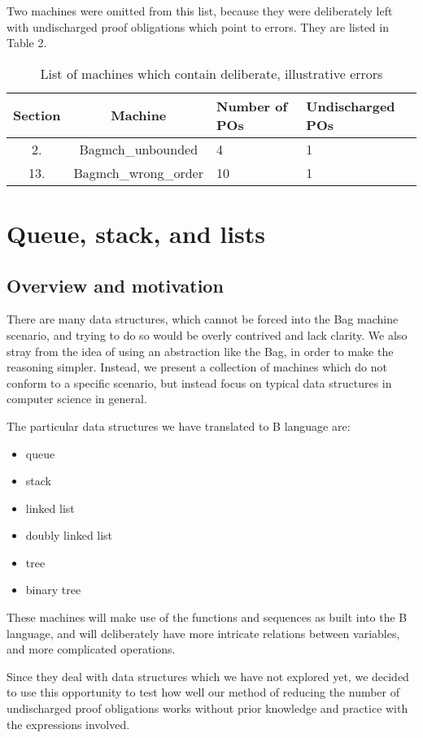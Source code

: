 \documentclass[11pt,journal]{IEEEtran}
\begin{document}
	Two machines were omitted from this list, because they were deliberately left with undischarged proof obligations which point to errors. They are listed in Table 2.
	
	\begin{table}[h]
		\centering
		\begin{tabular}
			{|c|c|m{1cm}|m{1.7cm}|}
			\hline
			Section & Machine & Number of POs & Undischarged POs \\ 
			\hline 
			 2. & Bagmch\_unbounded & 4 & 1  \\ 
			13. & Bagmch\_wrong\_order & 10 & 1\\ 
			\hline 
			
		\end{tabular}
		
		\caption{List of machines which contain deliberate, illustrative errors}
	\end{table}
	\section{Queue, stack, and lists}
	\subsection{Overview and motivation}
	There are many data structures, which cannot be forced into the Bag machine scenario, and trying to do so would be overly contrived and lack clarity. We also stray from the idea of using an abstraction like the Bag, in order to make the reasoning simpler. Instead, we present a collection of machines which do not conform to a specific scenario, but instead focus on typical data structures in computer science in general.
	
	The particular data structures we have translated to B language are:
	\begin{itemize}
		\item queue
		\item stack
		\item linked list
		\item doubly linked list
		\item tree
		\item binary tree
	\end{itemize}
	
	These machines will make use of the functions and sequences as built into the B language, and will deliberately have more intricate relations between variables, and more complicated operations.
	
	Since they deal with data structures which we have not explored yet, we decided to use this opportunity to test how well our method of reducing the number of undischarged proof obligations works without prior knowledge and practice with the expressions involved. 
	
\end{document}
